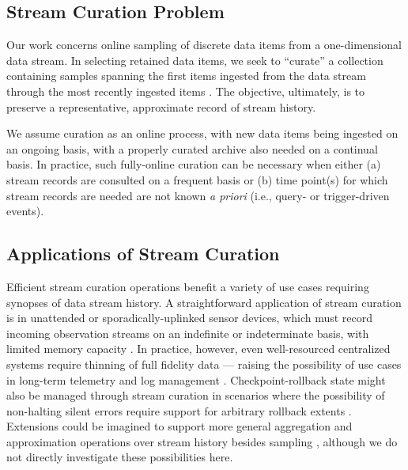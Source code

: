 \subsection{Stream Curation Problem}

Our work concerns online sampling of discrete data items from a one-dimensional data stream.
In selecting retained data items, we seek to ``curate'' a collection containing samples spanning the first items ingested from the data stream through the most recently ingested items \citep{moreno2024algorithms}.
The objective, ultimately, is to preserve a representative, approximate record of stream history.

We assume curation as an online process, with new data items being ingested on an ongoing basis, with a properly curated archive also needed on a continual basis.
In practice, such fully-online curation can be necessary when either (a) stream records are consulted on a frequent basis or (b) time point(s) for which stream records are needed are not known \textit{a priori} (i.e., query- or trigger-driven events).





\subsection{Applications of Stream Curation}

Efficient stream curation operations benefit a variety of use cases requiring synopses of data stream history.
A straightforward application of stream curation is in unattended or sporadically-uplinked sensor devices, which must record incoming observation streams on an indefinite or indeterminate basis, with limited memory capacity \citep{jain2022survey}.
In practice, however, even well-resourced centralized systems require thinning of full fidelity data --- raising the possibility of use cases in long-term telemetry and log management \citep{kent2006guide,miebach2002hubble}.
Checkpoint-rollback state might also be managed through stream curation in scenarios where the possibility of non-halting silent errors require support for arbitrary rollback extents \citep{aupy2013combination}.
Extensions could be imagined to support more general aggregation and approximation operations over stream history besides sampling \citep{schoellhammer2024lightweight}, although we do not directly investigate these possibilities here.

